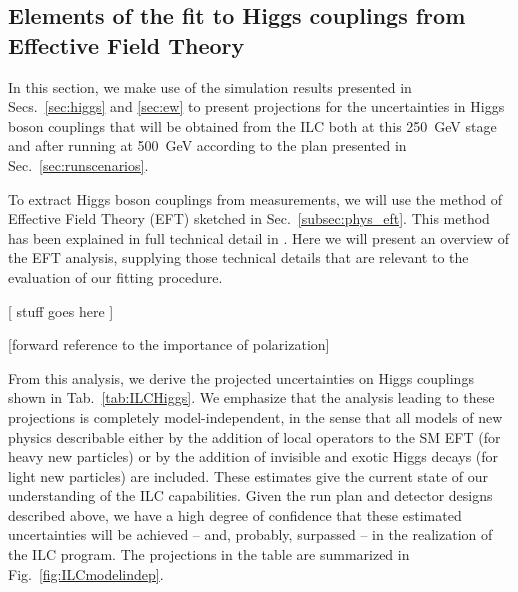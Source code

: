 

\subsection{Elements of the fit to Higgs couplings from Effective Field Theory}
\label{subsec:global:elements}


In this section, we make use of the simulation results presented in
Secs.~\ref{sec:higgs} and \ref{sec:ew} to present projections for the
uncertainties in Higgs boson couplings that will be obtained from the
ILC both at this 250~GeV stage and after running at 500~GeV according
to the plan presented in Sec.~\ref{sec:runscenarios}.   

To extract
Higgs boson couplings from measurements, we will use the method of
Effective Field Theory (EFT) sketched in Sec.~\ref{subsec:phys_eft}.
This method has been explained in full technical  detail in
\cite{Barklow:2017suo,Barklow:2017awn}.
Here we will present an overview of the EFT analysis, supplying those 
technical details that are relevant to the evaluation of our fitting procedure.

[ stuff goes here ] 

[forward reference to the importance of polarization]

From this analysis, we derive the projected uncertainties on Higgs
couplings shown in Tab.~\ref{tab:ILCHiggs}.  We emphasize that the
analysis leading to these projections is completely model-independent,
in the sense that all models of new physics describable either by the
addition  of local operators to the SM EFT (for heavy new particles)
or by the addition of invisible and exotic Higgs decays (for light new
particles) are included.  These estimates give the
current state of our understanding of the ILC capabilities.  Given the
run plan and  detector designs described above, we have a high degree
of confidence that these estimated uncertainties will be achieved --
and, probably, surpassed -- in the realization of the ILC program.
The projections in the table are summarized in Fig.~\ref{fig:ILCmodelindep}.



